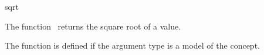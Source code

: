 \begin{ccRefFunction}{sqrt}

\ccDefinition

The function \ccRefName\ returns the square root of a value.

The function is defined if the argument type 
is a model of the  concept. 


{}



\ccSeeAlso

\\
\\

\end{ccRefFunction}
